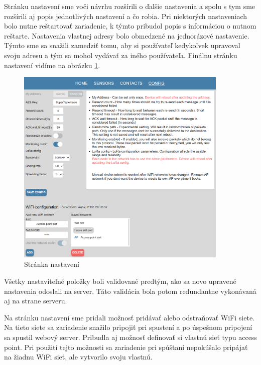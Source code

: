 \documentclass[slovak,master]{diploma}
\begin{document}
Stránku nastavení sme voči návrhu rozšírili o ďalšie nastavenia a spolu s tym sme rozšírili aj popis jednotlivých nastavení a čo robia. 
Pri niektorých nastaveniach bolo nutne reštartovať zariadenie, k týmto pribudol popis s informáciou o nutnom reštarte. 
Nastavenia vlastnej adresy bolo obmedzené na jednorázové nastavenie. Týmto sme sa snažili zamedziť tomu, aby si používateľ kedykoľvek 
upravoval svoju adresu a tým sa mohol vydávať za iného používateľa. Finálnu stránku nastavení vidíme na obrázku \ref{fig:webConfig}.

\begin{figure}[h!]
  \centering
  \includegraphics[width=0.9\textwidth]{Figures/webConfig.png}
  \caption{Stránka nastavení}
  \label{fig:webConfig}
\end{figure}

Všetky nastaviteľné položky boli validované predtým, ako sa novo upravené nastavenia odoslali na server. Táto validácia bola potom redundantne 
vykonávaná aj na strane serveru.

Na stránku nastavení sme pridali možnosť pridávať alebo odstraňovať WiFi siete. Na tieto siete sa zariadenie snažilo pripojiť pri spustení a 
po úspešnom pripojení sa spustil webový server. Pribudla aj možnosť definovať si vlastnú sieť typu access point. Pri použití tejto možnosti sa zariadenie pri spúštaní 
nepokúšalo pripájať na žiadnu WiFi sieť, ale vytvorilo svoju vlastnú.
\end{document}
